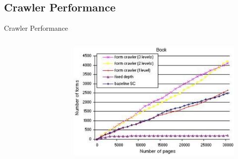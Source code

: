 \documentclass{beamer}
\begin{document}
\subsection{Crawler Performance}
\begin{frame}[fragile]{Crawler Performance}
\begin{columns}[T,onlytextwidth]
	\begin{figure}
\captionsetup[subfigure]{labelformat=empty}
\end{figure}
  		\begin{figure}
		\includegraphics[width=\linewidth]{bookDomainCP.png}

\end{figure}
\end{columns}
\end{frame}
\end{document}

